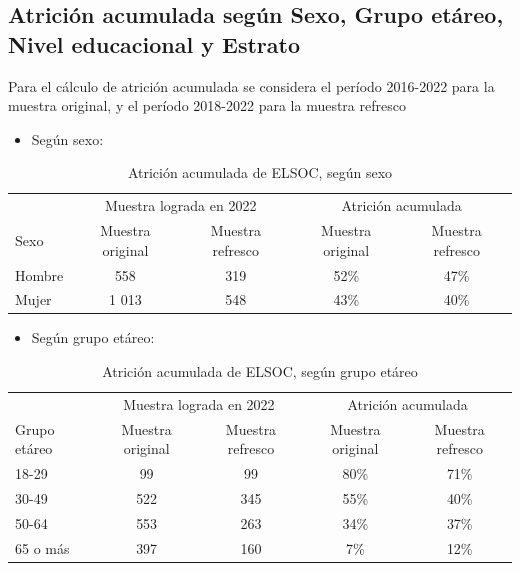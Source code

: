 \documentclass[
  12pt,
]{book}
\providecommand{\tightlist}{%
  \setlength{\itemsep}{0pt}\setlength{\parskip}{0pt}}
\begin{document}
\hypertarget{atriciuxf3n-acumulada-seguxfan-sexo-grupo-etuxe1reo-nivel-educacional-y-estrato}{%
\subsection*{Atrición acumulada según Sexo, Grupo etáreo, Nivel educacional y Estrato}\label{atriciuxf3n-acumulada-seguxfan-sexo-grupo-etuxe1reo-nivel-educacional-y-estrato}}

Para el cálculo de atrición acumulada se considera el período 2016-2022 para la muestra original, y el período 2018-2022 para la muestra refresco

\begin{itemize}
\tightlist
\item
  Según sexo:
\end{itemize}

\begin{table}

\caption{\label{tab:tabla-atricion-sexo}Atrición acumulada de ELSOC, según sexo}
\centering
\begin{tabular}[t]{l|c|c|c|c}
\hline
\multicolumn{1}{c|}{ } & \multicolumn{2}{c|}{Muestra lograda en 2022} & \multicolumn{2}{c}{Atrición acumulada} \\
\cline{2-3} \cline{4-5}
Sexo & Muestra original & Muestra refresco & Muestra original & Muestra refresco\\
\hline
Hombre & 558 & 319 & 52\% & 47\%\\
\hline
Mujer & 1 013 & 548 & 43\% & 40\%\\
\hline
\end{tabular}
\end{table}

\begin{itemize}
\tightlist
\item
  Según grupo etáreo:
\end{itemize}

\begin{table}

\caption{\label{tab:tabla-atricion-edad}Atrición acumulada de ELSOC, según grupo etáreo}
\centering
\begin{tabular}[t]{l|c|c|c|c}
\hline
\multicolumn{1}{c|}{ } & \multicolumn{2}{c|}{Muestra lograda en 2022} & \multicolumn{2}{c}{Atrición acumulada} \\
\cline{2-3} \cline{4-5}
Grupo etáreo & Muestra original & Muestra refresco & Muestra original & Muestra refresco\\
\hline
18-29 & 99 & 99 & 80\% & 71\%\\
\hline
30-49 & 522 & 345 & 55\% & 40\%\\
\hline
50-64 & 553 & 263 & 34\% & 37\%\\
\hline
65 o más & 397 & 160 & 7\% & 12\%\\
\hline
\end{tabular}
\end{table}
\end{document}

